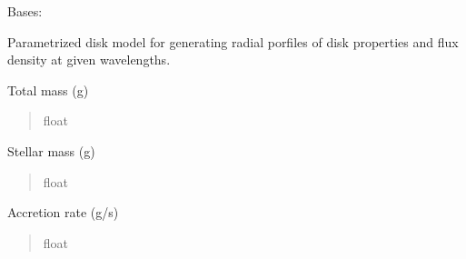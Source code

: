 \documentclass[a4paper,11pt,english]{sphinxmanual}
\begin{document}
\begin{fulllineitems}
\label{\detokenize{x22:disk_model.DiskModel}}
\pysigstartsignatures
\pysiglinewithargsret
{}
{\sphinxparamcomma {}}
{}
\pysigstopsignatures
\sphinxAtStartPar
Bases: 

\sphinxAtStartPar
Parametrized disk model for generating radial porfiles of disk
properties and flux density at given wavelengths.

\begin{fulllineitems}
\label{\detokenize{x22:disk_model.DiskModel.M}}
\pysigstartsignatures
\pysigline
{}
\pysigstopsignatures
\sphinxAtStartPar
Total mass (g)
\begin{quote}\begin{description}
\sphinxAtStartPar
float

\end{description}\end{quote}

\end{fulllineitems}


\begin{fulllineitems}
\label{\detokenize{x22:disk_model.DiskModel.Mstar}}
\pysigstartsignatures
\pysigline
{}
\pysigstopsignatures
\sphinxAtStartPar
Stellar mass (g)
\begin{quote}\begin{description}
\sphinxAtStartPar
float

\end{description}\end{quote}

\end{fulllineitems}


\begin{fulllineitems}
\label{\detokenize{x22:disk_model.DiskModel.Mdot}}
\pysigstartsignatures
\pysigline
{}
\pysigstopsignatures
\sphinxAtStartPar
Accretion rate (g/s)
\begin{quote}\begin{description}
\sphinxAtStartPar
float


\end{description}
\end{quote}
\end{fulllineitems}
\end{fulllineitems}
\end{document}
